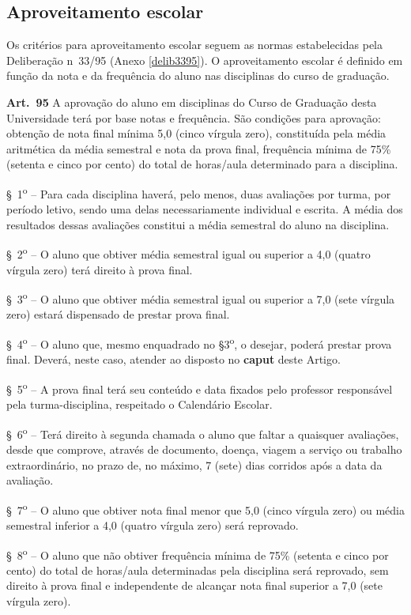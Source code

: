 \subsection{Aproveitamento escolar}
Os critérios para aproveitamento escolar seguem as normas estabelecidas pela Deliberação n\textordmasculine~33/95 (Anexo \ref{delib3395}). O aproveitamento escolar é definido em função da nota e da frequência do aluno nas disciplinas do curso de graduação.
\begin{itquotation}

  \textbf{Art.~95} A aprovação do aluno em disciplinas do Curso de Graduação desta Universidade terá por base notas e frequência. São condições para aprovação: obtenção de nota final mínima 5,0 (cinco vírgula zero), constituída pela média aritmética da média semestral e nota da prova final, frequência mínima de 75\% (setenta e cinco por cento) do total de horas/aula determinado para a disciplina.

  \S~1\textsuperscript{o} -- Para cada disciplina haverá, pelo menos, duas avaliações por turma, por período letivo, sendo uma delas necessariamente individual e escrita. A média dos resultados dessas avaliações constitui a média semestral do aluno na disciplina.

  \S~2\textsuperscript{o} -- O aluno que obtiver média semestral igual ou superior a 4,0 (quatro vírgula zero) terá direito à prova final.

  \S~3\textsuperscript{o} -- O aluno que obtiver média semestral igual ou superior a 7,0 (sete vírgula zero) estará dispensado de prestar prova final.

  \S~4\textsuperscript{o} -- O aluno que, mesmo enquadrado no \S 3\textsuperscript{o}, o desejar, poderá prestar prova final. Deverá, neste caso, atender ao disposto no \textbf{caput} deste Artigo.

  \S~5\textsuperscript{o} -- A prova final terá seu conteúdo e data fixados pelo professor responsável pela turma-disciplina, respeitado o Calendário Escolar.

  \S~6\textsuperscript{o} -- Terá direito à segunda chamada o aluno que faltar a quaisquer avaliações, desde que
  comprove, através de documento, doença, viagem a serviço ou trabalho extraordinário, no prazo de,
  no máximo, 7 (sete) dias corridos após a data da avaliação.

  \S~7\textsuperscript{o} -- O aluno que obtiver nota final menor que 5,0 (cinco vírgula zero) ou média semestral inferior a 4,0 (quatro vírgula zero) será reprovado.

  \S~8\textsuperscript{o} -- O aluno que não obtiver frequência mínima de 75\% (setenta e cinco por cento) do total de horas/aula determinadas pela disciplina será reprovado, sem direito à prova final e independente de alcançar nota final superior a 7,0 (sete vírgula zero).
\end{itquotation}


